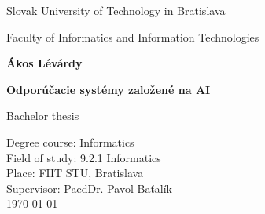 \documentclass[\myFontSize,oneside,english,hidelinks,a4paper]{article}
\newcommand{\thesisTitle}[0] {Odporúčacie systémy založené na AI}
\begin{document}
 

\begin{center}
\thispagestyle{empty}
{\Large Slovak University of Technology in Bratislava}
\par\end{center}{\Large \par}

\begin{center}
{\Large Faculty of Informatics and Information Technologies} 
\par\end{center}{\Large \par}

\smallskip{}

\vfill{}

\begin{center}
\textbf{\Large Ákos Lévárdy}
\par\end{center}{\Large \par}

\medskip{}

\begin{center}
\textbf{\Large \thesisTitle}
\par\end{center}{\Large \par}

\medskip{}

\begin{center}
{\Large Bachelor thesis}
\par\end{center}{\Large \par}

\vfill{}

\Large{
Degree course: Informatics\\ 
Field of study: 9.2.1 Informatics\\ 
Place: FIIT STU, Bratislava\\ 
Supervisor: PaedDr. Pavol Baťalík\\
\today}

%
\end{document}
